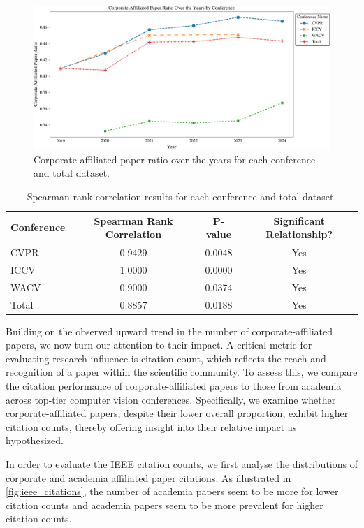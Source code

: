 \documentclass{article}
\begin{document}
\begin{figure}[ht]
  \centering
  \includegraphics[width=\textwidth]{report/images/corporate_ratio_graph_final.png}  
  \caption{Corporate affiliated paper ratio over the years for each conference and total dataset.}
  \label{fig:corporate_ratio_graph}
\end{figure}

\begin{table}[ht]
\centering
\begin{tabular}{|l|c|c|c|}
\hline
\textbf{Conference} & \textbf{Spearman Rank Correlation} & \textbf{P-value} & \textbf{Significant Relationship?} \\ \hline
CVPR & 0.9429 & 0.0048 & Yes \\ \hline
ICCV & 1.0000 & 0.0000 & Yes \\ \hline
WACV & 0.9000 & 0.0374 & Yes \\ \hline
Total & 0.8857 & 0.0188 & Yes \\ \hline
\end{tabular}
\caption{Spearman rank correlation results for each conference and total dataset.}
\label{tab:spearman_results}
\end{table}

Building on the observed upward trend in the number of corporate-affiliated papers, we now turn our attention to their impact. A critical metric for evaluating research influence is citation count, which reflects the reach and recognition of a paper within the scientific community. To assess this, we compare the citation performance of corporate-affiliated papers to those from academia across top-tier computer vision conferences. Specifically, we examine whether corporate-affiliated papers, despite their lower overall proportion, exhibit higher citation counts, thereby offering insight into their relative impact as hypothesized. 

In order to evaluate the IEEE citation counts, we first analyse the distributions of corporate and academia affiliated paper citations. As illustrated in \cref{fig:ieee_citations}, the number of academia papers seem to be more for lower citation counts and academia papers seem to be more prevalent for higher citation counts.  
\end{document}

